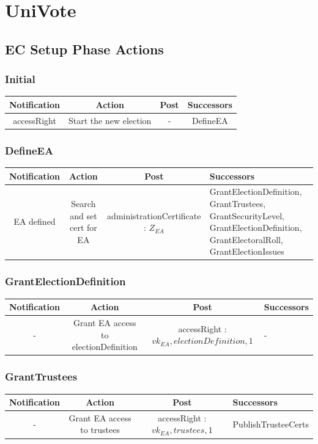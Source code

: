 \documentclass[bibtotoc,halfparskip,oneside]{scrreprt}
\begin{document}
\chapter{UniVote}


\begin{landscape}
\section{EC Setup Phase Actions}
\subsection{Initial}
\begin{tabular}{|c|c|c|c|}
\hline Notification & Action & Post & Successors\\ 
\hline accessRight & Start the new election & -  & DefineEA \\ 
\hline 
\end{tabular} 

\subsection{DefineEA}
\begin{tabularx}{\linewidth}{|c|c|c|X|}
\hline Notification & Action & Post & Successors\\ 
\hline EA defined & Search and set cert for EA & administrationCertificate : $Z_{EA}$ & GrantElectionDefinition, GrantTrustees, GrantSecurityLevel, GrantElectionDefinition, GrantElectoralRoll, GrantElectionIssues \\ 
\hline 
\end{tabularx} 

\subsection{GrantElectionDefinition}
\begin{tabularx}{\linewidth}{|c|c|c|X|}
\hline Notification & Action & Post & Successors\\ 
\hline - & Grant EA access to electionDefinition & accessRight : $vk_{EA} , electionDefinition  ,1 $ & - \\ 
\hline 
\end{tabularx}

\subsection{GrantTrustees}
\begin{tabularx}{\linewidth}{|c|c|c|X|}
\hline Notification & Action & Post & Successors\\ 
\hline - & Grant EA access to trustees & accessRight : $vk_{EA} , trustees, 1 $ & PublishTrusteeCerts \\  
\hline 
\end{tabularx}


\end{landscape}
\end{document}
